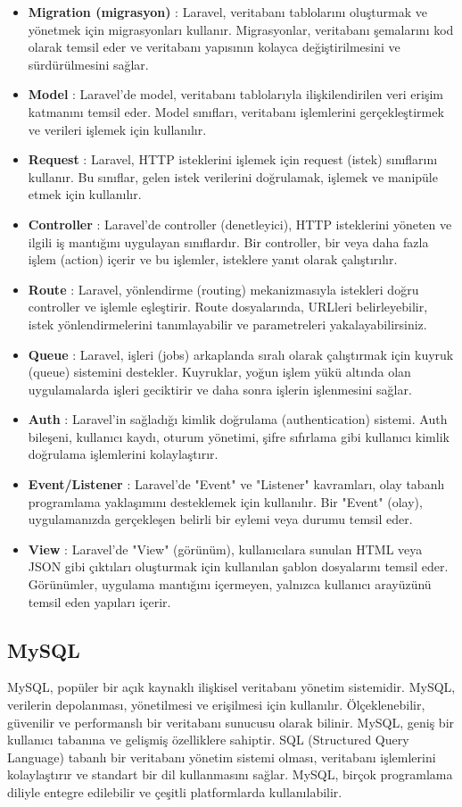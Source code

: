 \begin{itemize}
  \item \textbf{Migration (migrasyon)} : Laravel, veritabanı tablolarını oluşturmak ve yönetmek için migrasyonları kullanır. Migrasyonlar, veritabanı şemalarını kod olarak temsil eder ve veritabanı yapısının kolayca değiştirilmesini ve sürdürülmesini sağlar.
  \item \textbf{Model} : Laravel'de model, veritabanı tablolarıyla ilişkilendirilen veri erişim katmanını temsil eder. Model sınıfları, veritabanı işlemlerini gerçekleştirmek ve verileri işlemek için kullanılır.
  \item \textbf{Request} :  Laravel, HTTP isteklerini işlemek için request (istek) sınıflarını kullanır. Bu sınıflar, gelen istek verilerini doğrulamak, işlemek ve manipüle etmek için kullanılır.
  \item \textbf{Controller} : Laravel'de controller (denetleyici), HTTP isteklerini yöneten ve ilgili iş mantığını uygulayan sınıflardır. Bir controller, bir veya daha fazla işlem (action) içerir ve bu işlemler, isteklere yanıt olarak çalıştırılır.
  \item \textbf{Route} : Laravel, yönlendirme (routing) mekanizmasıyla istekleri doğru controller ve işlemle eşleştirir. Route dosyalarında, URLleri belirleyebilir, istek yönlendirmelerini tanımlayabilir ve parametreleri yakalayabilirsiniz.
  \item \textbf{Queue} : Laravel, işleri (jobs) arkaplanda sıralı olarak çalıştırmak için kuyruk (queue) sistemini destekler. Kuyruklar, yoğun işlem yükü altında olan uygulamalarda işleri geciktirir ve daha sonra işlerin işlenmesini sağlar.
  \item \textbf{Auth} : Laravel'in sağladığı kimlik doğrulama (authentication) sistemi. Auth bileşeni, kullanıcı kaydı, oturum yönetimi, şifre sıfırlama gibi kullanıcı kimlik doğrulama işlemlerini kolaylaştırır.
  \item \textbf{Event/Listener} : Laravel'de "Event" ve "Listener" kavramları, olay tabanlı programlama yaklaşımını desteklemek için kullanılır. Bir "Event" (olay), uygulamanızda gerçekleşen belirli bir eylemi veya durumu temsil eder.
  \item \textbf{View} : Laravel'de "View" (görünüm), kullanıcılara sunulan HTML veya JSON gibi çıktıları oluşturmak için kullanılan şablon dosyalarını temsil eder. Görünümler, uygulama mantığını içermeyen, yalnızca kullanıcı arayüzünü temsil eden yapıları içerir.
\end{itemize}
\subsection{MySQL}
MySQL, popüler bir açık kaynaklı ilişkisel veritabanı yönetim sistemidir. MySQL, verilerin depolanması, yönetilmesi ve erişilmesi için kullanılır. Ölçeklenebilir, güvenilir ve performanslı bir veritabanı sunucusu olarak bilinir. MySQL, geniş bir kullanıcı tabanına ve gelişmiş özelliklere sahiptir. SQL (Structured Query Language) tabanlı bir veritabanı yönetim sistemi olması, veritabanı işlemlerini kolaylaştırır ve standart bir dil kullanmasını sağlar. MySQL, birçok programlama diliyle entegre edilebilir ve çeşitli platformlarda kullanılabilir.

